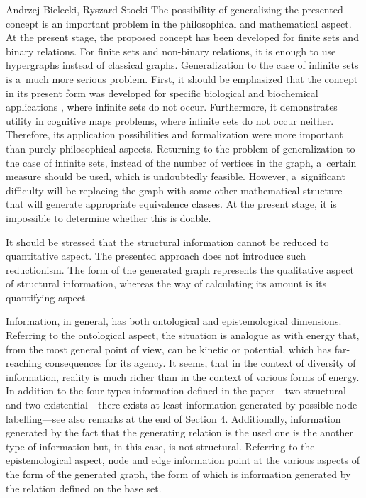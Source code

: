 \begin{artengenv2auth}{Andrzej Bielecki, Ryszard Stocki}
The possibility of generalizing the presented concept is an important problem in the philosophical and mathematical aspect. At the present stage, the proposed concept has been developed for finite sets and binary relations. For finite sets and non-binary relations, it is enough to use hypergraphs 
\parencite[][]{berge_hypergraphs_1989} %
 instead of classical graphs. Generalization to the case of infinite sets is a~much more serious problem. First, it should be emphasized that the concept in its present form was developed for specific biological and biochemical applications 
\parencites[][]{bielecki_general_2015}[][]{bielecki_information_2022}, %
 where infinite sets do not occur. Furthermore, it demonstrates utility in cognitive maps problems, where infinite sets do not occur neither. Therefore, its application possibilities and formalization were more important than purely philosophical aspects. Returning to the problem of generalization to the case of infinite sets, instead of the number of vertices in the graph, a~certain measure should be used, which is undoubtedly feasible. However, a~significant difficulty will be replacing the graph with some other mathematical structure that will generate appropriate equivalence classes. At the present stage, it is impossible to determine whether this is doable.



It should be stressed that the structural information cannot be reduced to quantitative aspect. The presented approach does not introduce such reductionism. The form of the generated graph represents the qualitative aspect of structural information, whereas the way of calculating its amount is its quantifying aspect.



Information, in general, has both ontological and epistemological dimensions. Referring to the ontological aspect, the situation is analogue as with energy that, from the most general point of view, can be kinetic or potential, which has far-reaching consequences for its agency. It seems, that in the context of diversity of information, reality is much richer than in the context of various forms of energy. In addition to the four types information defined in the paper---two structural and two existential---there exists at least information generated by possible node labelling---see also remarks at the end of Section 4. Additionally, information generated by the fact that the generating relation is the used one is the another type of information but, in this case, is not structural. Referring to the epistemological aspect, node and edge information point at the various aspects of the form of the generated graph, the form of which is information generated by the relation defined on the base set.




\end{artengenv2auth}
